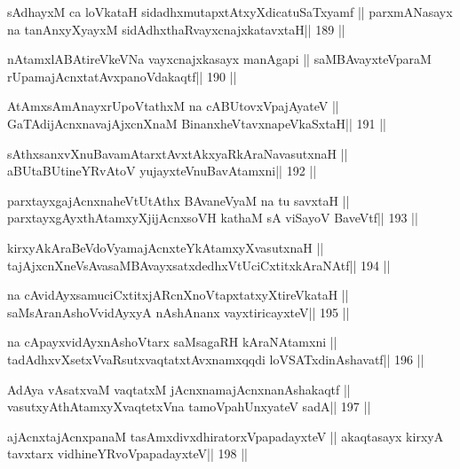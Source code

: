 \begin{shl}
sAdhayxM ca loVkataH sidadhxmutapxtAtxyXdicatuSaTxyamf ||
parxmANasayx na tanAnxyXyayxM sidAdhxthaRvayxcnajxkatavxtaH\hfill || 189 ||
\end{shl}

\begin{shl}
nA\s\s tamxlABAtireVkeVNa vayxcnajxkasayx manAgapi ||
saMBAvayxteV\s paraM rUpamajAcnxtatAvxpanoVdakaqtf\hfill || 190 ||
\end{shl}

\begin{shl}
AtAmxsAmAnayxrUpoVtathxM na cABUtovxVpajAyateV ||
GaTAdijAcnxnavajAjxcnXnaM BinanxheVtavxnapeVkaSxtaH\hfill || 191 ||
\end{shl}

\begin{shl}
sAthxsanxvXnuBavamAtarxtAvxtAkxyaRkAraNavasutxnaH ||
aBUtaBUtineYRvAtoV yujayxteV\s nuBavAtamxni\hfill || 192 ||
\end{shl}

\begin{shl}
parxtayxgajAcnxnaheVtUtAthx BAvaneVyaM na tu savxtaH ||
parxtayxgAyxthAtamxyXjijAcnxsoVH kathaM sA viSayoV BaveVtf\hfill || 193 ||
\end{shl}

\begin{shl}
kirxyAkAraBeVdoV\s yamajAcnxteYkAtamxyXvasutxnaH ||
tajAjxcnXneV\s sAvasaMBAvayxsatxdedhxVtUciCxtitxkAraNAtf\hfill || 194 ||
\end{shl}

\begin{shl}
na cAvidAyxsamuciCxtitxjARcnXnoVtapxtatxyXtireVkataH ||
saMsAranAshoV\s vidAyxyA nAshAnanx vayxtiricayxteV\hfill || 195 ||
\end{shl}

\begin{shl}
na cApayxvidAyxnAshoV\s tarx saMsagaRH kAraNAtamxni ||
tadAdhxvXsetxVvaRsutxvaqtatxtAvxnamxqqdi loVSATxdinAshavatf\hfill || 196 ||
\end{shl}

\begin{shl}
AdAya vAsatxvaM vaqtatxM jAcnxnamajAcnxnanAshakaqtf ||
vasutxyAthAtamxyXvaqtetxVna tamoV\s pahUnxyateV sadA\hfill || 197 ||
\end{shl}

\begin{shl}
ajAcnxtajAcnxpanaM tasAmxdivxdhiratorxVpapadayxteV ||
akaqtasayx kirxyA tavxtarx vidhineYRvoVpapadayxteV\hfill || 198 ||
\end{shl}

